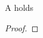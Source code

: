 \documentclass{amsart}
\begin{document}
\begin{claim}
A holds
\end{claim}

\begin{proof}
\end{proof}
\end{document}
